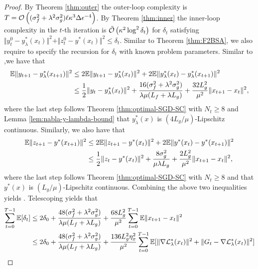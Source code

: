 {\begin{proof}
By Theorem \ref{thm:outer} the outer-loop complexity is $ T =  {\mathcal{O}} \left( (\sigma_f^2 + \lambda^2 \sigma_g^2) \ell \kappa^3 \Delta \epsilon^{-4} \right) $. By Theorem \ref{thm:inner} the inner-loop complexity in the $t$-th iteration is $\tilde {{\mathcal{O}}} \left( \kappa^2 \log^2 \delta_t \right)$ for $\delta_t$ satisfying $\Vert y_t^0 - y_{\lambda}^*(x_t) \Vert^2 + \Vert z_t^0 - y^*(x_t) \Vert^2 \le \delta_t$.
Similar to Theorem \ref{thm:F2BSA}, we also require to specify the recursion for $\delta_t$ with known problem parameters. Similar to ,we have that
\begin{align*}
   {\mathbb{E}} \Vert y_{t+1}-  y_{\lambda}^*(x_{t+1}) \Vert^2  &\le 2 {\mathbb{E}} \Vert y_{t+1} - y_{\lambda}^*(x_{t}) \Vert^2 + 2 {\mathbb{E}} \Vert y_{\lambda}^*(x_{t}) - y_{\lambda}^*(x_{t+1}) \Vert^2 \\
    &\le \frac{1}{2} \Vert y_t - y_{\lambda}^*(x_t) \Vert^2 + \frac{16 (\sigma_f^2 + \lambda^2 \sigma_g^2)}{ \lambda \mu (L_f + \lambda L_g)} + \frac{32 L_g^2}{\mu^2} \Vert x_{t+1} - x_t \Vert^2, 
\end{align*}
where the last step follows Theorem \ref{thm:optimal-SGD-SC} with $N_t \ge 8$ and Lemma \ref{lem:nabla-y-lambda-bound} that $y_{\lambda}^*(x)$ is $(4L_g/\mu)$-Lipschitz continuous. Similarly, we also have that
\begin{align*}
{\mathbb{E}} \Vert z_{t+1}-  y^*(x_{t+1}) \Vert^2   &\le 2 {\mathbb{E}} \Vert z_{t+1} - y^*(x_{t}) \Vert^2 + 2 {\mathbb{E}} \Vert y^*(x_{t}) - y^*(x_{t+1}) \Vert^2 \\
    &\le \frac{1}{2} \Vert z_t - y^*(x_t) \Vert^2 + \frac{8 \sigma_g^2}{ \mu \lambda L_g} + \frac{2 L_g^2}{\mu^2} \Vert x_{t+1} - x_t \Vert^2, 
\end{align*}
where the last step follows Theorem \ref{thm:optimal-SGD-SC} with $N_t \ge 8$
and that $y^*(x)$ is $(L_g/\mu)$-Lipschitz continuous. Combining the above two inequalities yields . Telescoping  yields that
\begin{align*}
    \sum_{t=0}^{T-1} \BE[\delta_{t}] &\le 2\delta_0  + \frac{48 (\sigma_f^2+ \lambda^2 \sigma_g^2)}{\lambda \mu (L_f + \lambda L_g)} + \frac{68 L_g^2}{\mu^2} \sum_{t=0}^{T-1} \BE  \Vert x_{t+1} - x_t \Vert^2 \\
    &\le 2\delta_0 + \frac{48 (\sigma_f^2+ \lambda^2 \sigma_g^2)}{\lambda \mu (L_f + \lambda L_g)} + \frac{136 L_g^2 \eta_x^2}{\mu^2} \sum_{t=0}^{T-1} \BE [\Vert 
    \nabla \fL_{\lambda}^*(x_t)
    \Vert^2+ \Vert G_t - \nabla \fL_{\lambda}^*(x_t) \Vert^2] \\

\end{align*}
\end{proof}}
